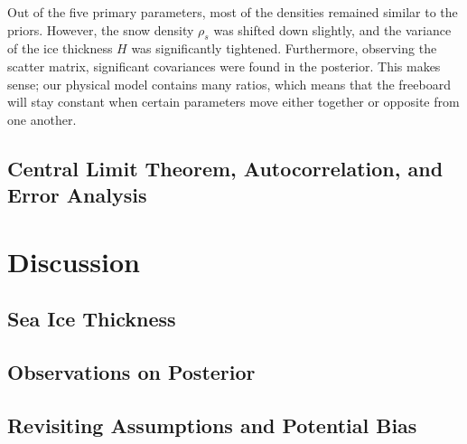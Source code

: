 \documentclass[12pt, letterpaper]{article}
\begin{document}
Out of the five primary parameters, most of the densities remained similar to the priors. However, the snow density $\rho_s$ was shifted down slightly,
and the variance of the ice thickness $H$ was significantly tightened. Furthermore, observing the scatter matrix, significant covariances were
found in the posterior. This makes sense; our physical model contains many ratios, which means that the freeboard will stay constant when
certain parameters move either together or opposite from one another.

\subsection{Central Limit Theorem, Autocorrelation, and Error Analysis}

\section{Discussion}

\subsection{Sea Ice Thickness}

\subsection{Observations on Posterior}

\subsection{Revisiting Assumptions and Potential Bias}
\end{document}
